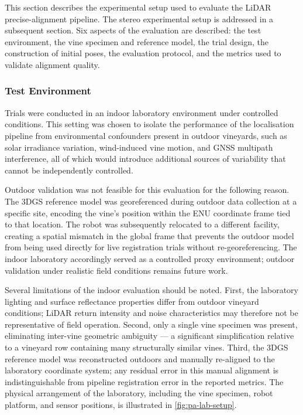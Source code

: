 This section describes the experimental setup used to evaluate the LiDAR precise-alignment pipeline. The stereo experimental setup is addressed in a subsequent section. Six aspects of the evaluation are described: the test environment, the vine specimen and reference model, the trial design, the construction of initial poses, the evaluation protocol, and the metrics used to validate alignment quality.

\subsubsection{Test Environment}
\label{subsubsec:pa-test-environment}

Trials were conducted in an indoor laboratory environment under controlled conditions. This setting was chosen to isolate the performance of the localisation pipeline from environmental confounders present in outdoor vineyards, such as solar irradiance variation, wind-induced vine motion, and GNSS multipath interference, all of which would introduce additional sources of variability that cannot be independently controlled.

Outdoor validation was not feasible for this evaluation for the following reason. The 3DGS reference model was georeferenced during outdoor data collection at a specific site, encoding the vine's position within the ENU coordinate frame tied to that location. The robot was subsequently relocated to a different facility, creating a spatial mismatch in the global frame that prevents the outdoor model from being used directly for live registration trials without re-georeferencing. The indoor laboratory accordingly served as a controlled proxy environment; outdoor validation under realistic field conditions remains future work.

Several limitations of the indoor evaluation should be noted. First, the laboratory lighting and surface reflectance properties differ from outdoor vineyard conditions; LiDAR return intensity and noise characteristics may therefore not be representative of field operation. Second, only a single vine specimen was present, eliminating inter-vine geometric ambiguity --- a significant simplification relative to a vineyard row containing many structurally similar vines. Third, the 3DGS reference model was reconstructed outdoors and manually re-aligned to the laboratory coordinate system; any residual error in this manual alignment is indistinguishable from pipeline registration error in the reported metrics. The physical arrangement of the laboratory, including the vine specimen, robot platform, and sensor positions, is illustrated in \cref{fig:pa-lab-setup}.

